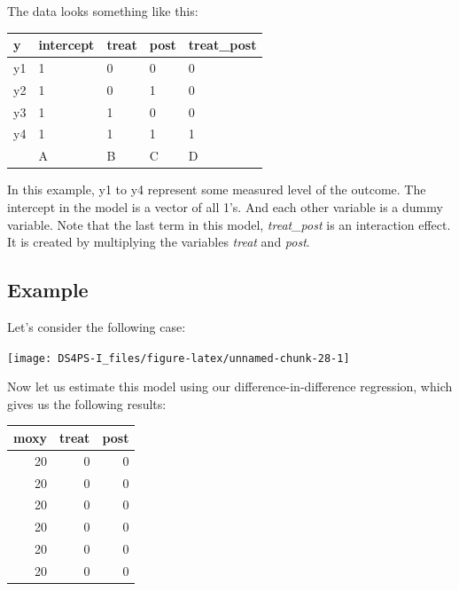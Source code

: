 \documentclass[]{book}
\theoremstyle{definition}
\theoremstyle{definition}
\theoremstyle{definition}
\theoremstyle{remark}
\begin{document}
The data looks something like this:

\begin{tabular}{l|l|l|l|l}
\hline
y & intercept & treat & post & treat\_post\\
\hline
y1 & 1 & 0 & 0 & 0\\
\hline
y2 & 1 & 0 & 1 & 0\\
\hline
y3 & 1 & 1 & 0 & 0\\
\hline
y4 & 1 & 1 & 1 & 1\\
\hline
 & A & B & C & D\\
\hline
\end{tabular}

In this example, y1 to y4 represent some measured level of the outcome.
The intercept in the model is a vector of all 1's. And each other
variable is a dummy variable. Note that the last term in this model,
\emph{treat\_post} is an interaction effect. It is created by
multiplying the variables \emph{treat} and \emph{post}.

\hypertarget{example-1}{%
\subsection{Example}\label{example-1}}

Let's consider the following case:

\begin{center}\texttt{[image: DS4PS-I\_files/figure-latex/unnamed-chunk-28-1]} \end{center}

Now let us estimate this model using our difference-in-difference
regression, which gives us the following results:

\begin{tabular}{r|r|r}
\hline
moxy & treat & post\\
\hline
20 & 0 & 0\\
\hline
20 & 0 & 0\\
\hline
20 & 0 & 0\\
\hline
20 & 0 & 0\\
\hline
20 & 0 & 0\\
\hline
20 & 0 & 0\\
\hline
\end{tabular}
\end{document}
